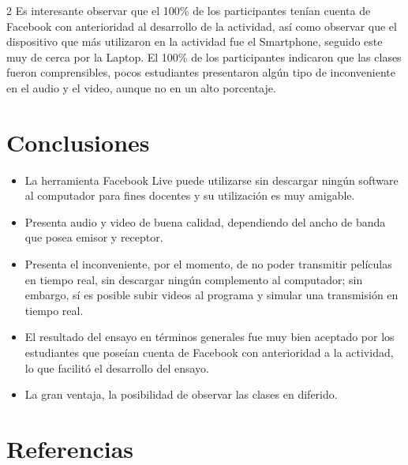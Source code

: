 \documentclass[11pt,spanish,Letterpaper,openany]{book}
\begin{document}
\begin {multicols}{2}
Es interesante observar que el 100\% de los participantes tenían cuenta de Facebook con anterioridad al desarrollo de la actividad, así como observar que el dispositivo que más utilizaron en la actividad fue el Smartphone, seguido este muy de cerca por la Laptop. El 100\% de los participantes indicaron que las clases fueron comprensibles, pocos estudiantes presentaron algún tipo de inconveniente en el audio y el video, aunque no en un alto porcentaje.

\hypertarget{conclusiones-4}{%
\section{Conclusiones}\label{conclusiones-4}}

\begin{itemize}
\item
  La herramienta Facebook Live puede utilizarse sin descargar ningún software al computador para fines docentes y su utilización es muy amigable.
\item
  Presenta audio y video de buena calidad, dependiendo del ancho de banda que posea emisor y receptor.
\item
  Presenta el inconveniente, por el momento, de no poder transmitir películas en tiempo real, sin descargar ningún complemento al computador; sin embargo, sí es posible subir videos al programa y simular una transmisión en tiempo real.
\item
  El resultado del ensayo en términos generales fue muy bien aceptado por los estudiantes que poseían cuenta de Facebook con anterioridad a la actividad, lo que facilitó el desarrollo del ensayo.
\item
  La gran ventaja, la posibilidad de observar las clases en diferido.
\end{itemize}

\hypertarget{referencias-4}{%
\section{Referencias}\label{referencias-4}}


\end{multicols}
\end{document}

